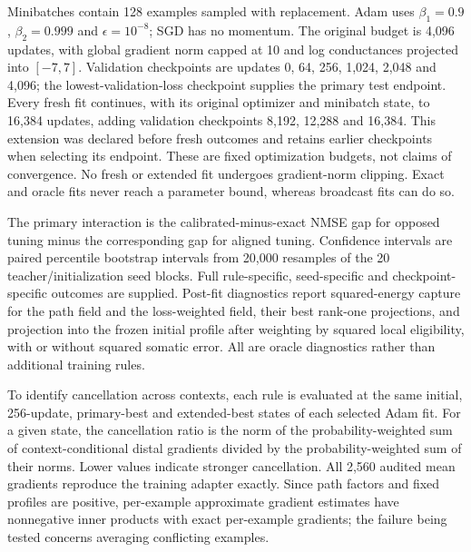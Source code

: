 Minibatches contain 128 examples sampled with replacement. Adam uses $\beta_1=0.9$, $\beta_2=0.999$ and $\epsilon=10^{-8}$; SGD has no momentum. The original budget is 4,096 updates, with global gradient norm capped at 10 and log conductances projected into $[-7,7]$. Validation checkpoints are updates 0, 64, 256, 1,024, 2,048 and 4,096; the lowest-validation-loss checkpoint supplies the primary test endpoint. Every fresh fit continues, with its original optimizer and minibatch state, to 16,384 updates, adding validation checkpoints 8,192, 12,288 and 16,384. This extension was declared before fresh outcomes and retains earlier checkpoints when selecting its endpoint. These are fixed optimization budgets, not claims of convergence. No fresh or extended fit undergoes gradient-norm clipping. Exact and oracle fits never reach a parameter bound, whereas broadcast fits can do so.

The primary interaction is the calibrated-minus-exact NMSE gap for opposed tuning minus the corresponding gap for aligned tuning. Confidence intervals are paired percentile bootstrap intervals from 20,000 resamples of the 20 teacher/initialization seed blocks. Full rule-specific, seed-specific and checkpoint-specific outcomes are supplied. Post-fit diagnostics report squared-energy capture for the path field and the loss-weighted field, their best rank-one projections, and projection into the frozen initial profile after weighting by squared local eligibility, with or without squared somatic error. All are oracle diagnostics rather than additional training rules.

To identify cancellation across contexts, each rule is evaluated at the same initial, 256-update, primary-best and extended-best states of each selected Adam fit. For a given state, the cancellation ratio is the norm of the probability-weighted sum of context-conditional distal gradients divided by the probability-weighted sum of their norms. Lower values indicate stronger cancellation. All 2,560 audited mean gradients reproduce the training adapter exactly. Since path factors and fixed profiles are positive, per-example approximate gradient estimates have nonnegative inner products with exact per-example gradients; the failure being tested concerns averaging conflicting examples.

